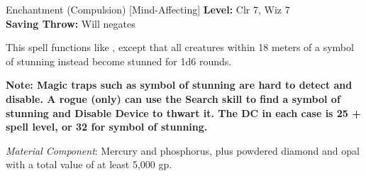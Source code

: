 {Enchantment (Compulsion) [Mind-Affecting]}
{
	\textbf{Level:}
	Clr 7, Wiz 7\\
	\textbf{Saving Throw:}
	Will negates\\
}
{
	This spell functions like , except that all creatures within 18 meters of a symbol of stunning instead become stunned for 1d6 rounds.

	\textbf{Note: Magic traps such as symbol of stunning are hard to detect and disable. A rogue (only) can use the Search skill to find a symbol of stunning and Disable Device to thwart it. The DC in each case is 25 + spell level, or 32 for symbol of stunning.}

	\textit{Material Component}:
	Mercury and phosphorus, plus powdered diamond and opal with a total value of at least 5,000 gp.

}
